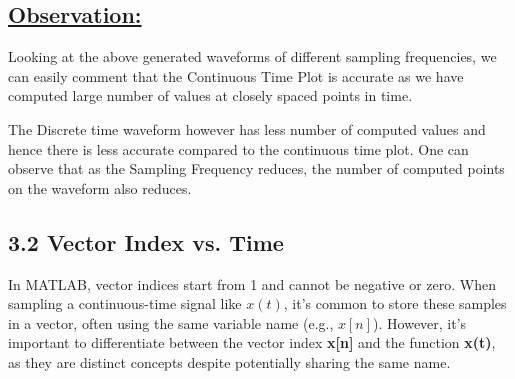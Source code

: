 \documentclass[a4paper,12pt,fleqn]{article}
\begin{document}
\subsection*{\underline{Observation:}}
Looking at the above generated waveforms of different sampling frequencies, we can easily comment that the Continuous Time Plot is accurate as we have computed large number of values at closely spaced points in time. 

The Discrete time waveform however has less number of computed values and hence there is less accurate compared to the continuous time plot. One can observe that as the Sampling Frequency reduces, the number of computed points on the waveform also reduces.

\FloatBarrier  %
\newpage  %

\subsection*{3.2 Vector Index vs. Time}
In MATLAB, vector indices start from 1 and cannot be negative or zero. When sampling a continuous-time signal like \( x(t) \), it's common to store these samples in a vector, often using the same variable name (e.g., \( x[n] \)). However, it's important to differentiate between the vector index \textbf{ x[n]} and the function \textbf{x(t)}, as they are distinct concepts despite potentially sharing the same name.
\end{document}
